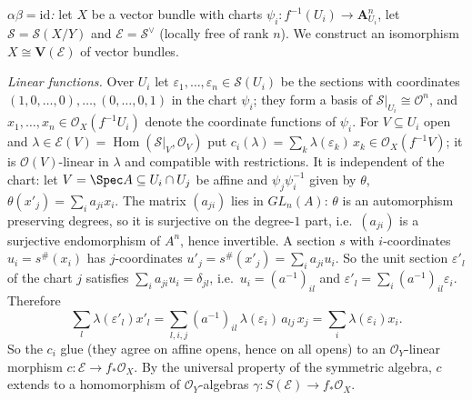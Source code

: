 \documentclass[11pt]{article}
\begin{document}
\emph{$\alpha\beta=\mathrm{id}$:} let $X$ be a vector bundle with charts $\psi_i:f^{-1}(U_i)\to\mathbf A^n_{U_i}$, let $\mathcal S=\mathcal S(X/Y)$ and $\mathcal E=\mathcal S^\vee$ (locally free of rank $n$). We construct an isomorphism $X\cong\mathbf V(\mathcal E)$ of vector bundles.

\emph{Linear functions.} Over $U_i$ let $\varepsilon_1,\dots,\varepsilon_n\in\mathcal S(U_i)$ be the sections with coordinates $(1,0,\dots,0),\dots,(0,\dots,0,1)$ in the chart $\psi_i$; they form a basis of $\mathcal S|_{U_i}\cong\mathcal O^n$, and $x_1,\dots,x_n\in\mathcal O_X(f^{-1}U_i)$ denote the coordinate functions of $\psi_i$. For $V\subseteq U_i$ open and $\lambda\in\mathcal E(V)=\operatorname{Hom}(\mathcal S|_V,\mathcal O_V)$ put $c_i(\lambda)=\sum_k\lambda(\varepsilon_k)\,x_k\in\mathcal O_X(f^{-1}V)$; it is $\mathcal O(V)$-linear in $\lambda$ and compatible with restrictions. It is independent of the chart: let $V=\Spec A\subseteq U_i\cap U_j$ be affine and $\psi_j\psi_i^{-1}$ given by $\theta$, $\theta(x'_j)=\sum_ia_{ji}x_i$. The matrix $(a_{ji})$ lies in $GL_n(A)$: $\theta$ is an automorphism preserving degrees, so it is surjective on the degree-$1$ part, i.e.\ $(a_{ji})$ is a surjective endomorphism of $A^n$, hence invertible. A section $s$ with $i$-coordinates $u_i=s^\#(x_i)$ has $j$-coordinates $u'_j=s^\#(x'_j)=\sum_ia_{ji}u_i$. So the unit section $\varepsilon'_l$ of the chart $j$ satisfies $\sum_ia_{ji}u_i=\delta_{jl}$, i.e.\ $u_i=(a^{-1})_{il}$ and $\varepsilon'_l=\sum_i(a^{-1})_{il}\varepsilon_i$. Therefore
\[
\sum_l\lambda(\varepsilon'_l)x'_l=\sum_{l,i,j}(a^{-1})_{il}\,\lambda(\varepsilon_i)\,a_{lj}\,x_j=\sum_i\lambda(\varepsilon_i)x_i .
\]
So the $c_i$ glue (they agree on affine opens, hence on all opens) to an $\mathcal O_Y$-linear morphism $c:\mathcal E\to f_*\mathcal O_X$. By the universal property of the symmetric algebra, $c$ extends to a homomorphism of $\mathcal O_Y$-algebras $\gamma:S(\mathcal E)\to f_*\mathcal O_X$.
\end{document}
